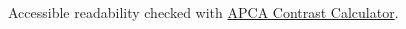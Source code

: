 \documentclass[lighthipster]{simplehipstercv}
\begin{document}
\begin{paracol}{2}
\begin{center}
{      Accessible readability checked with \href{http://www.myndex.com/APCA/}{APCA Contrast Calculator}.
    }
  \end{center}

  \vspace{4em}
\end{paracol}
\end{document}
